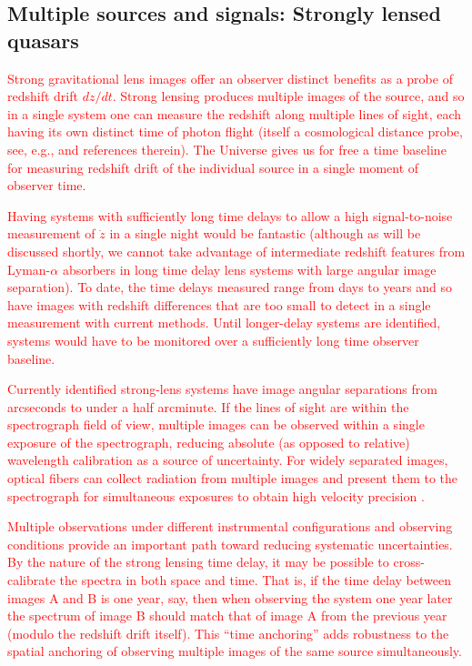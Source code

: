 \documentclass[preprint2, 10pt]{aastex}
\begin{document}
\subsection{Multiple sources and signals: Strongly lensed quasars} \label{sec:lens} 
\textcolor{red}{
Strong gravitational lens images offer an observer distinct
benefits as a probe of redshift drift $dz/dt$. Strong lensing produces multiple images of the source, 
and so in a single system one can measure the redshift along multiple 
lines of sight, each having its own distinct time of photon flight (itself
a cosmological distance probe, see, e.g., \citet{13061272} 
and references therein).
The Universe gives us for free a time baseline for measuring
redshift drift of the individual source in a single moment of observer time.
}


\textcolor{red}{
Having systems with sufficiently long time delays to allow a
high signal-to-noise measurement of $\dot{z}$ in a single night would
be fantastic (although as will be discussed shortly, we cannot take advantage of intermediate redshift features from 
Lyman-$\alpha$ absorbers in long time delay lens systems with large angular image separation).
To date, the time delays measured range from days to
years \citep{2007ApJ...662...62F,2008ApJ...676..761F, 2013ApJ...764..186F}
and so have images with redshift
differences that are too small to detect in a single measurement with current methods.
Until longer-delay systems are identified, systems would
have to be monitored over a sufficiently long time observer baseline.}



\textcolor{red}{
Currently identified strong-lens systems have image angular separations from arcseconds
to under a half arcminute.
If the lines of sight are within the spectrograph field of view, 
multiple images can be observed within
a single exposure of the spectrograph, reducing
absolute (as opposed to relative) wavelength calibration as a source
of uncertainty.
For widely separated images, optical fibers can collect radiation from multiple images
and present them to the spectrograph for simultaneous exposures to obtain high velocity precision \citep{2012SPIE.8446E..1VC}.
} 



\textcolor{red}{Multiple observations under different instrumental configurations
and observing conditions provide an important path toward reducing systematic
uncertainties. 
By the nature of the strong lensing time delay, it may be possible 
to cross-calibrate the spectra in both space and time.  That is, if the time 
delay between images A and B is one year, say, then when observing the system 
one year later the spectrum of image B should match that of image A from 
the previous year (modulo the redshift drift itself).  This ``time anchoring'' adds robustness to 
the spatial anchoring of observing multiple images of the same source 
simultaneously. 
}
\end{document}
